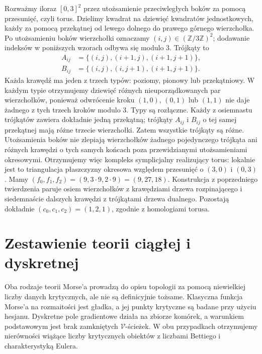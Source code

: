 \begin{przyklad}
Rozważmy iloraz $[0,3]^2$ przez utożsamienie
przeciwległych boków za pomocą przesunięć, czyli
torus. Dzielimy kwadrat na dziewięć kwadratów
jednostkowych, każdy za pomocą przekątnej
od lewego dolnego do prawego górnego wierzchołka.
Po utożsamieniu boków wierzchołki oznaczamy
$(i,j)\in(\mathbb Z/3\mathbb Z)^2$; dodawanie
indeksów w poniższych wzorach odbywa się modulo $3$.
Trójkąty to
\[
 \begin{split}
 A_{ij}&=\{(i,j),(i+1,j),(i+1,j+1)\},\\
 B_{ij}&=\{(i,j),(i,j+1),(i+1,j+1)\}.
 \end{split}
\]
Każda krawędź ma jeden z trzech typów: poziomy,
pionowy lub przekątniowy. W każdym typie otrzymujemy
dziewięć różnych nieuporządkowanych par wierzchołków,
ponieważ odwrócenie kroku $(1,0)$, $(0,1)$ lub $(1,1)$
nie daje żadnego z tych trzech kroków modulo $3$.
Typy są rozłączne. Każdy z osiemnastu trójkątów
zawiera dokładnie jedną przekątną; trójkąty $A_{ij}$
i $B_{ij}$ o tej samej przekątnej mają różne trzecie
wierzchołki. Zatem wszystkie trójkąty są różne.
Utożsamienia boków nie zlepiają wierzchołków
żadnego pojedynczego trójkąta ani różnych krawędzi
o tych samych końcach poza przewidzianymi
utożsamieniami okresowymi. Otrzymujemy więc
kompleks symplicjalny realizujący torus: lokalnie
jest to triangulacja płaszczyzny okresowa względem
przesunięć o $(3,0)$ i $(0,3)$.
Mamy $(f_0,f_1,f_2)=(9,3\cdot9,2\cdot9)=(9,27,18)$.
Konstrukcja z poprzedniego twierdzenia
paruje osiem wierzchołków z krawędziami
drzewa rozpinającego i siedemnaście
dalszych krawędzi z trójkątami drzewa
dualnego. Pozostają dokładnie
$(c_0,c_1,c_2)=(1,2,1)$, zgodnie
z homologiami torusa.
\end{przyklad}

\section{Zestawienie teorii ciągłej i dyskretnej}
\label{sec:tg-morse-bridge}

Oba rodzaje teorii Morse'a prowadzą do opisu topologii
za pomocą niewielkiej liczby danych krytycznych,
ale nie są definicyjnie tożsame. Klasyczna funkcja
Morse'a na rozmaitości jest gładka, a jej
punkty krytyczne są badane przy użyciu hesjanu.
Dyskretne pole gradientowe działa na zbiorze komórek,
a warunkiem podstawowym jest brak zamkniętych
$\mathcal V$-ścieżek. W obu przypadkach otrzymujemy
nierówności wiążące liczby krytycznych obiektów
z liczbami Bettiego i charakterystyką Eulera.

